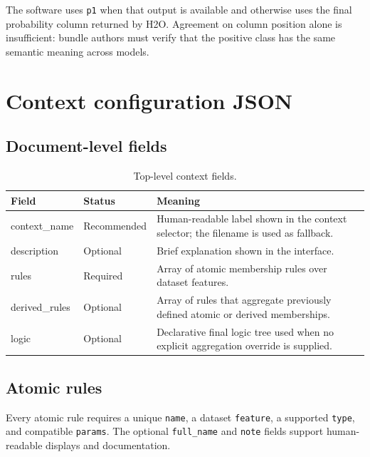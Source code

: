 \documentclass[11pt,a4paper]{article}
\begin{document}
The software uses \texttt{p1} when that output is available and otherwise uses the final probability column returned by H2O. Agreement on column position alone is insufficient: bundle authors must verify that the positive class has the same semantic meaning across models.

\section{Context configuration JSON}

\subsection{Document-level fields}

\begin{table}[ht]
\centering
\caption{Top-level context fields.}
\begin{tabularx}{\textwidth}{>{\ttfamily\raggedright\arraybackslash}p{2.7cm} >{\raggedright\arraybackslash}p{2.55cm} >{\raggedright\arraybackslash}X}
\toprule
\normalfont\textbf{Field} & \textbf{Status} & \textbf{Meaning} \\
\midrule
context\_name & Recommended & Human-readable label shown in the context selector; the filename is used as fallback. \\
description & Optional & Brief explanation shown in the interface. \\
rules & Required & Array of atomic membership rules over dataset features. \\
derived\_rules & Optional & Array of rules that aggregate previously defined atomic or derived memberships. \\
logic & Optional & Declarative final logic tree used when no explicit aggregation override is supplied. \\
\bottomrule
\end{tabularx}
\end{table}

\subsection{Atomic rules}

Every atomic rule requires a unique \texttt{name}, a dataset \texttt{feature}, a supported \texttt{type}, and compatible \texttt{params}. The optional \texttt{full\_name} and \texttt{note} fields support human-readable displays and documentation.
\end{document}
